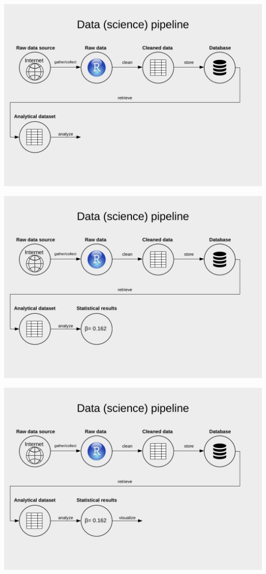 \documentclass[
  ignorenonframetext,
]{beamer}
\begin{document}
\begin{frame}
\begin{center}\includegraphics[width=0.9\linewidth]{../../img/ds10} \end{center}
\end{frame}

\begin{frame}
\begin{center}\includegraphics[width=0.9\linewidth]{../../img/ds11} \end{center}
\end{frame}

\begin{frame}
\begin{center}\includegraphics[width=0.9\linewidth]{../../img/ds12} \end{center}
\end{frame}
\end{document}
